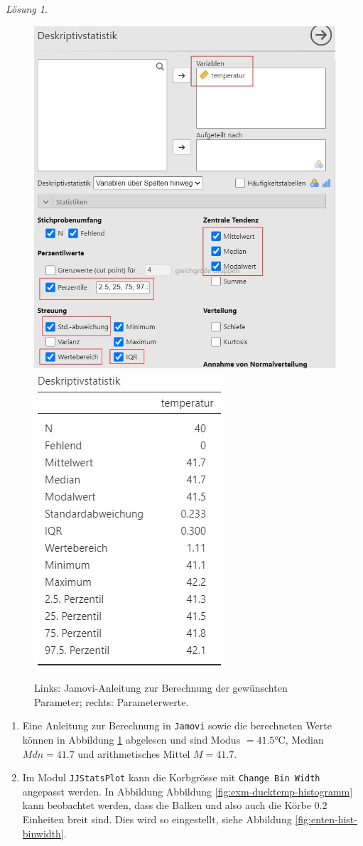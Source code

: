 \documentclass[
]{book}
\providecommand{\tightlist}{%
  \setlength{\itemsep}{0pt}\setlength{\parskip}{0pt}}
\theoremstyle{definition}
\theoremstyle{definition}
\theoremstyle{definition}
\theoremstyle{definition}
\theoremstyle{remark}
\newtheorem*{solution}{Lösung}
\begin{document}
\begin{solution}
\begin{figure}
\includegraphics[width=0.5\linewidth]{figures/02-exr-enten-hist-mean-sd-input} \includegraphics[width=0.5\linewidth]{figures/02-exr-enten-hist-mean-sd-output} \caption{Links: Jamovi-Anleitung zur Berechnung der gewünschten Parameter; rechts: Parameterwerte.}\label{fig:enten-hist-mean-sd2}
\end{figure}

\begin{enumerate}
\def\labelenumi{(\alph{enumi})}
\setcounter{enumi}{1}
\tightlist
\item
  Eine Anleitung zur Berechnung in \texttt{Jamovi} sowie die berechneten Werte können in Abbildung \ref{fig:enten-hist-mean-sd2} abgelesen und sind Modus \(= 41.5\)°C, Median \(Mdn = 41.7\) und arithmetisches Mittel \(M=41.7\).
\item
  Im Modul \texttt{JJStatsPlot} kann die Korbgrösse mit \texttt{Change\ Bin\ Width} angepasst werden. In Abbildung Abbildung \ref{fig:exm-ducktemp-histogramm} kann beobachtet werden, dass die Balken und also auch die Körbe \(0.2\) Einheiten breit sind. Dies wird so eingestellt, siehe Abbildung \ref{fig:enten-hist-binwidth}.
\end{enumerate}


\end{solution}
\end{document}

